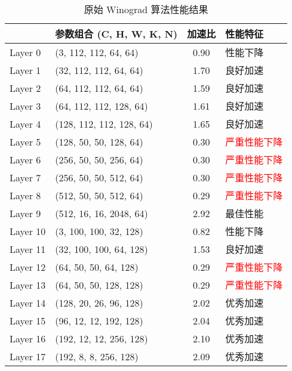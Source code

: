 \documentclass[a4paper,12pt,scheme=plain]{ctexart}
\numberwithin{equation}{section} %
\begin{document}
\begin{table}[h]
    \renewcommand{\arraystretch}{1.25}
    \centering
    \caption{原始 Winograd 算法性能结果}
    \begin{tabular}{|l|l|c|l|}
    \hline
            & \textbf{参数组合} (C, H, W, K, N)     & \textbf{加速比}  & \textbf{性能特征}       \\
    \hline
    Layer 0  & (3, 112, 112, 64, 64)    & 0.90 & \textcolor{red!60!white}{性能下降}   \\
    Layer 1  & (32, 112, 112, 64, 64)   & 1.70 & 良好加速       \\
    Layer 2  & (64, 112, 112, 64, 64)   & 1.59 & 良好加速       \\
    Layer 3  & (64, 112, 112, 128, 64)  & 1.61 & 良好加速       \\
    Layer 4  & (128, 112, 112, 128, 64) & 1.65 & 良好加速       \\
    Layer 5  & (128, 50, 50, 128, 64)   & 0.30 & \textcolor{red}{严重性能下降} \\
    Layer 6  & (256, 50, 50, 256, 64)   & 0.30 & \textcolor{red}{严重性能下降} \\
    Layer 7  & (256, 50, 50, 512, 64)   & 0.30 & \textcolor{red}{严重性能下降} \\
    Layer 8  & (512, 50, 50, 512, 64)   & 0.29 & \textcolor{red}{严重性能下降} \\
    Layer 9  & (512, 16, 16, 2048, 64)  & 2.92 & \textcolor{green!60!black}{最佳性能}   \\
    Layer 10 & (3, 100, 100, 32, 128)   & 0.82 & \textcolor{red!60!white}{性能下降}   \\
    Layer 11 & (32, 100, 100, 64, 128)  & 1.53 & 良好加速       \\
    Layer 12 & (64, 50, 50, 64, 128)    & 0.29 & \textcolor{red}{严重性能下降} \\
    Layer 13 & (64, 50, 50, 128, 128)   & 0.29 & \textcolor{red}{严重性能下降} \\
    Layer 14 & (128, 20, 26, 96, 128)   & 2.02 & 优秀加速       \\
    Layer 15 & (96, 12, 12, 192, 128)   & 2.04 & 优秀加速       \\
    Layer 16 & (192, 12, 12, 256, 128)  & 2.10 & 优秀加速       \\
    Layer 17 & (192, 8, 8, 256, 128)    & 2.09 & 优秀加速       \\
    \hline
    \end{tabular}
\end{table}
\end{document}
